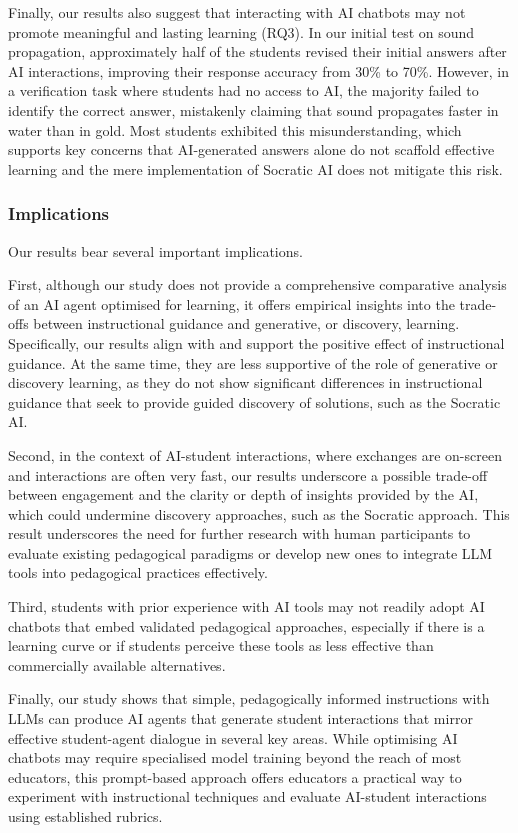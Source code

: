 \documentclass[
  11pt,
]{article}
\begin{document}
Finally, our results also suggest that interacting with AI chatbots may not promote meaningful and lasting learning (RQ3). In our initial test on sound propagation, approximately half of the students revised their initial answers after AI interactions, improving their response accuracy from 30\% to 70\%. However, in a verification task where students had no access to AI, the majority failed to identify the correct answer, mistakenly claiming that sound propagates faster in water than in gold. Most students exhibited this misunderstanding, which supports key concerns that AI-generated answers alone do not scaffold effective learning and the mere implementation of Socratic AI does not mitigate this risk.

\subsubsection{Implications}\label{implications}

Our results bear several important implications.

First, although our study does not provide a comprehensive comparative analysis of an AI agent optimised for learning, it offers empirical insights into the trade-offs between instructional guidance and generative, or discovery, learning. Specifically, our results align with and support the positive effect of instructional guidance. At the same time, they are less supportive of the role of generative or discovery learning, as they do not show significant differences in instructional guidance that seek to provide guided discovery of solutions, such as the Socratic AI.

Second, in the context of AI-student interactions, where exchanges are on-screen and interactions are often very fast, our results underscore a possible trade-off between engagement and the clarity or depth of insights provided by the AI, which could undermine discovery approaches, such as the Socratic approach. This result underscores the need for further research with human participants to evaluate existing pedagogical paradigms or develop new ones to integrate LLM tools into pedagogical practices effectively.

Third, students with prior experience with AI tools may not readily adopt AI chatbots that embed validated pedagogical approaches, especially if there is a learning curve or if students perceive these tools as less effective than commercially available alternatives.

Finally, our study shows that simple, pedagogically informed instructions with LLMs can produce AI agents that generate student interactions that mirror effective student-agent dialogue in several key areas. While optimising AI chatbots may require specialised model training beyond the reach of most educators, this prompt-based approach offers educators a practical way to experiment with instructional techniques and evaluate AI-student interactions using established rubrics.
\end{document}
